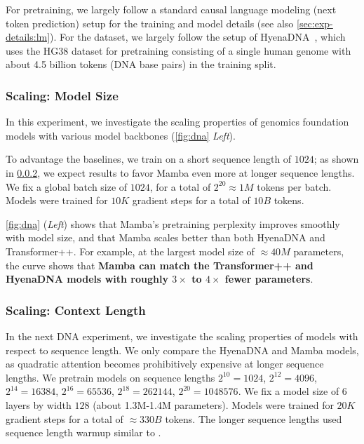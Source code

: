 
For pretraining, we largely follow a standard causal language modeling (next token prediction) setup for the training and model details (see also \cref{sec:exp-details:lm}).
For the dataset, we largely follow the setup of HyenaDNA~\citep{nguyen2023hyenadna}, which uses the HG38 dataset for pretraining consisting of a single human genome
with about 4.5 billion tokens (DNA base pairs) in the training split.

\subsubsection{Scaling: Model Size}


In this experiment, we investigate the scaling properties of genomics foundation models with various model backbones (\cref{fig:dna} \textit{Left}).
%


To advantage the baselines, we train on a short sequence length of $1024$; as shown in \cref{sec:exp:dna:length}, we expect results to favor Mamba even more at longer sequence lengths.
We fix a global batch size of $1024$, for a total of $2^{20} \approx 1M$ tokens per batch.
Models were trained for $10K$ gradient steps for a total of $10B$ tokens.

\cref{fig:dna} (\emph{Left}) shows that Mamba's pretraining perplexity improves smoothly with model size,
and that Mamba scales better than both HyenaDNA and Transformer++.
For example, at the largest model size of $\approx 40M$ parameters,
the curve shows that \textbf{Mamba can match the Transformer++ and HyenaDNA models with roughly $3\times$ to $4\times$ fewer parameters}.


\subsubsection{Scaling: Context Length}
\label{sec:exp:dna:length}

In the next DNA experiment, we investigate the scaling properties of models with respect to sequence length.
We only compare the HyenaDNA and Mamba models, as quadratic attention becomes prohibitively expensive at longer sequence lengths.
We pretrain models on sequence lengths $2^{10}=1024$, $2^{12}=4096$, $2^{14}=16384$, $2^{16}=65536$, $2^{18}=262144$, $2^{20}=1048576$.
We fix a model size of 6 layers by width $128$ (about 1.3M-1.4M parameters).
Models were trained for $20K$ gradient steps for a total of $\approx 330B$ tokens.
The longer sequence lengths used sequence length warmup similar to \citep{nguyen2023hyenadna}.

